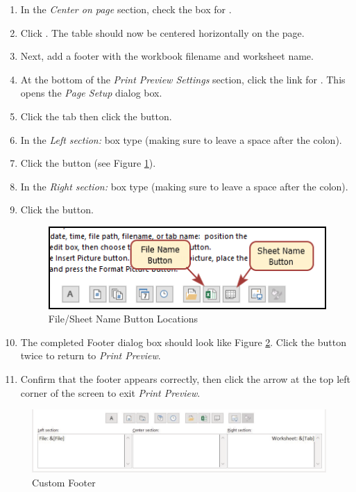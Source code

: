 \begin{enumerate}[resume]
	\item In the \textit{Center on page} section, check the box for .
	\item Click . The table should now be centered horizontally on the page.
	\item Next, add a footer with the workbook filename and worksheet name.
	\item At the bottom of the \textit{Print Preview Settings} section, click the link for . This opens the \textit{Page Setup} dialog box.	
	\item Click the  tab then click the  button.
	\item In the \textit{Left section:} box type  (making sure to leave a space after the colon).
	\item Click the  button (see Figure \ref{05:fig26a}).
	\item In the \textit{Right section:} box type  (making sure to leave a space after the colon).
	\item Click the  button.
	
	\begin{figure}[H]
		\centering
		\includegraphics[width=\maxwidth{.85\linewidth}]{gfx/ch05_fig26a}
		\caption{File/Sheet Name Button Locations}
		\label{05:fig26a}
	\end{figure}
		
	\item The completed Footer dialog box should look like Figure \ref{05:fig27}. Click the  button twice to return to \textit{Print Preview}. 
	\item Confirm that the footer appears correctly, then click the arrow at the top left corner of the screen to exit \textit{Print Preview}.
\end{enumerate}

\begin{figure}[H]
	\centering
	\includegraphics[width=\maxwidth{.95\linewidth}]{gfx/ch05_fig27}
	\caption{Custom Footer}
	\label{05:fig27}
\end{figure}

